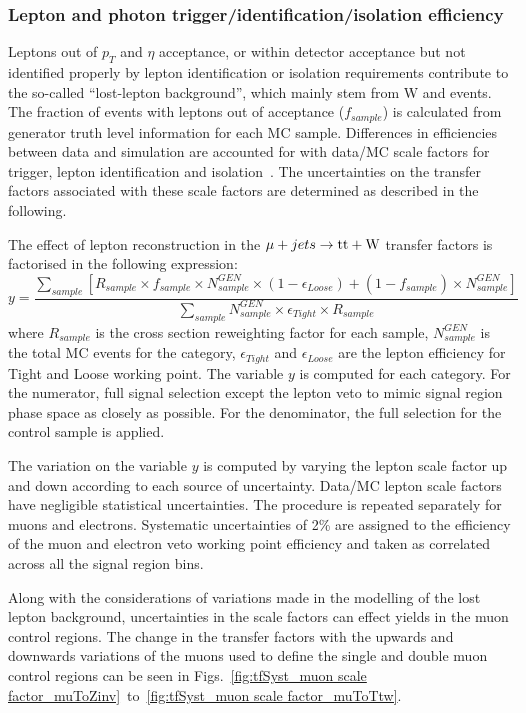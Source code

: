 \subsubsection*{Lepton and photon trigger/identification/isolation efficiency}
\label{sec:tfSyst_lepton}

Leptons out of $p_{T}$ and $\eta$ acceptance, or within detector
acceptance but not identified properly by lepton identification or isolation
requirements contribute to the so-called ``lost-lepton background'', 
which mainly stem from W and \ttbar events. 
The fraction of events with leptons out of acceptance ($f_{sample}$)
is calculated from generator truth level information for each MC
sample. Differences in efficiencies between data and simulation are
accounted for with data/MC scale
factors for trigger, lepton identification and isolation~\cite{twiki-leptonSF}. 
The uncertainties on the transfer factors associated 
with these scale factors are determined as described in the following.

The effect of lepton reconstruction in the $\mu + jets \rightarrow \mathrm{tt+W}$ 
transfer factors is factorised in the following expression: 
\begin{equation}
    \label{eq:lostLepTF}
    y = \frac{\sum_{sample} [ R_{sample} \times f_{sample} \times N^{GEN}_{sample} \times ( 1 - \epsilon_{Loose} ) + ( 1 - f_{sample} ) \times N^{GEN}_{sample} ]}{ \sum_{sample} N^{GEN}_{sample} \times \epsilon_{Tight} \times R_{sample} }
\end{equation}
where $R_{sample}$ is the cross section reweighting factor for each sample, 
$N^{GEN}_{sample}$ is the total MC events for the category, $\epsilon_{Tight}$
and $\epsilon_{Loose}$ are the lepton efficiency for Tight and Loose working 
point. The variable $y$ is computed for each category. For the numerator, full
signal selection except the lepton veto to mimic signal region phase space as
closely as possible. For the denominator, the full selection for the \mj 
control sample is applied.

The variation on the variable $y$ is computed by varying the lepton scale factor
up and down according to each source of uncertainty.
Data/MC lepton scale factors have negligible statistical uncertainties. 
The procedure is repeated separately for muons and
electrons.
Systematic uncertainties of 2\% are assigned to the efficiency of the muon and electron veto working point efficiency and taken as correlated across all the signal region bins. 

Along with the considerations of variations made in the modelling of
the lost lepton background, uncertainties in the scale factors can
effect yields in the muon control regions. The change in the transfer
factors with the upwards and downwards variations of the muons used to
define the single and double muon control regions can be seen in
Figs.~\ref{fig:tfSyst_muon scale
factor_muToZinv}~to~\ref{fig:tfSyst_muon scale factor_muToTtw}.

